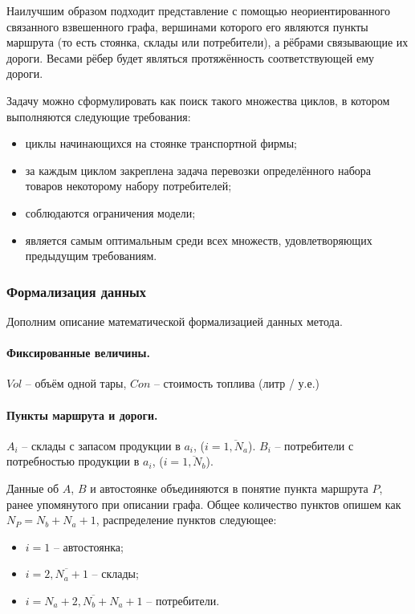 	Наилучшим образом подходит представление с помощью неориентированного связанного взвешенного графа, вершинами которого его являются пункты маршрута (то есть стоянка, склады или потребители), а рёбрами связывающие их дороги. Весами рёбер будет являться протяжённость соответствующей ему дороги.
	
	Задачу можно сформулировать как поиск такого множества циклов, в котором выполняются следующие требования:
	\begin{itemize}
		\item ‌циклы начинающихся на стоянке транспортной фирмы;
		\item ‌за каждым циклом закреплена задача перевозки определённого набора товаров некоторому набору потребителей;
		\item ‌соблюдаются ограничения модели;
		\item ‌является самым оптимальным среди всех множеств, удовлетворяющих предыдущим требованиям.
	\end{itemize}
	
	
	\subsubsection{Формализация данных}
	Дополним описание математической формализацией данных метода. 
	
	\paragraph*{Фиксированные величины.}
	$Vol$ -- объём одной тары, $Con$ -- стоимость топлива (литр / у.е.)
	
	\paragraph*{Пункты маршрута и дороги.}
	$A_i$ -- склады с запасом продукции в $a_i$, ($i = \overline{1, N_a}$). $B_i$ -- потребители с потребностью продукции в $a_i$, ($i = \overline{1, N_b}$).
	
	Данные об $A$, $B$ и автостоянке объединяются в понятие пункта маршрута $P$, ранее упомянутого при описании графа. Общее количество пунктов опишем как $N_P= N_b+N_a+1$, распределение пунктов следующее:
	\begin{itemize}
		\item $i = 1$ -- автостоянка;
		\item $i = \overline{2, N_a + 1}$ -- склады;
		\item $i = \overline{N_a+2, N_b+N_a+1}$ -- потребители.
	\end{itemize} 
	
